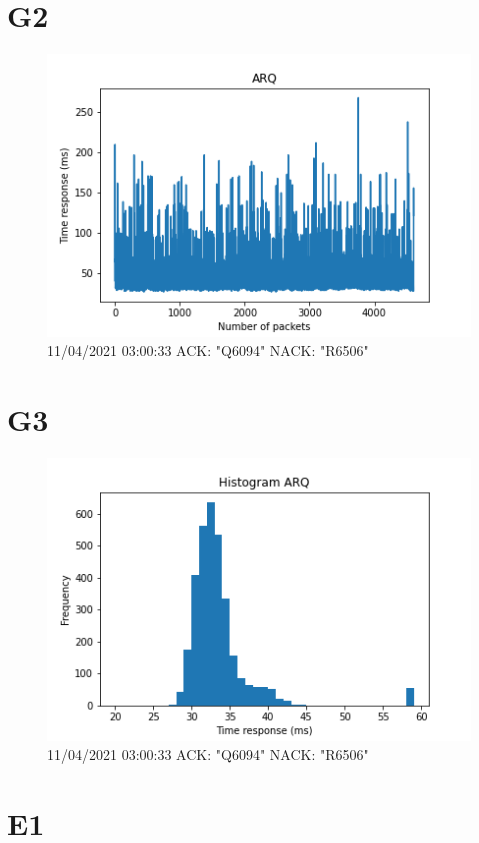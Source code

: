 \documentclass[hidelinks, 12pt, a4paper]{article}
\begin{document}
\pagebreak

\section{G2}

\begin{figure}[h!]
\centering
	\includegraphics[keepaspectratio, width=.8\textwidth]{arq.png}
	\caption{11/04/2021 03:00:33 ACK: "Q6094" NACK: "R6506"} 
\end{figure}


\section{G3}

\begin{figure}[h!]
\centering
	\includegraphics[keepaspectratio, width=.8\textwidth]{hist_arq.png}
	\caption{11/04/2021 03:00:33 ACK: "Q6094" NACK: "R6506"} 
\end{figure}

\pagebreak

\section{E1}
\end{document}
